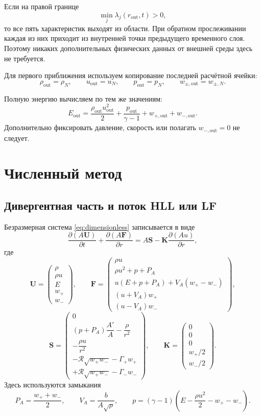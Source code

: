 \documentclass[11pt,a4paper]{article}
\newcommand{\PA}{P_A}
\newcommand{\Rref}{\mathcal R}
\providecommand{\U}{}
\renewcommand{\U}{\bm U}
\newcommand{\F}{\bm F}
\newcommand{\Src}{\bm S}
\begin{document}
Если на правой границе
\[
 \min_j\lambda_j(r_{\mathrm{out}},t)>0,
\]
то все пять характеристик выходят из области.
При обратном прослеживании каждая из них приходит
из внутренней точки предыдущего временного слоя.
Поэтому никаких дополнительных физических данных
от внешней среды здесь не требуется.

Для первого приближения используем копирование
последней расчётной ячейки:
\[
 \rho_{\mathrm{out}}=\rho_N,\qquad
 u_{\mathrm{out}}=u_N,\qquad
 p_{\mathrm{out}}=p_N,\qquad
 w_{\pm,\mathrm{out}}=w_{\pm,N}.
\]

Полную энергию вычисляем по тем же значениям:
\[
 E_{\mathrm{out}}
 =\frac{\rho_{\mathrm{out}}u_{\mathrm{out}}^2}{2}
  +\frac{p_{\mathrm{out}}}{\gamma-1}
  +w_{+,\mathrm{out}}+w_{-,\mathrm{out}}.
\]
Дополнительно фиксировать давление, скорость
или полагать $w_{-,\mathrm{out}}=0$ не следует.

\newpage

\section{Численный метод}


\subsection{Дивергентная часть и поток HLL или LF}

Безразмерная система \eqref{eq:dimensionless} записывается в виде
\begin{equation}
\boxed{
\frac{\partial(A\U)}{\partial t}
+\frac{\partial(A\F)}{\partial r}
=A\Src-\bm K\frac{\partial(Au)}{\partial r},
}
\end{equation}
где
\[
\U=
\begin{pmatrix}
\rho\\
\rho u\\
E\\
w_+\\
w_-
\end{pmatrix},
\qquad
\F=
\begin{pmatrix}
\rho u\\
\rho u^2+p+\PA\\
u(E+p+\PA)+V_A(w_+-w_-)\\
(u+V_A)w_+\\
(u-V_A)w_-
\end{pmatrix},
\]
\[
\Src=
\begin{pmatrix}
0\\[2pt]
(p+\PA)\dfrac{A'}{A}-\dfrac{\rho}{r^2}\\[6pt]
-\dfrac{\rho u}{r^2}\\[6pt]
-\Rref\sqrt{w_+w_-}-\Gamma_+w_+\\[4pt]
+\Rref\sqrt{w_+w_-}-\Gamma_-w_-
\end{pmatrix},
\qquad
\bm K=
\begin{pmatrix}
0\\0\\0\\w_+/2\\w_-/2
\end{pmatrix}.
\]
Здесь используются замыкания
\[
\PA=\frac{w_++w_-}{2},
\qquad
V_A=\frac{b}{A\sqrt{\rho}},
\qquad
p=(\gamma-1)
\left(E-\frac{\rho u^2}{2}-w_+-w_-\right).
\]
\end{document}
